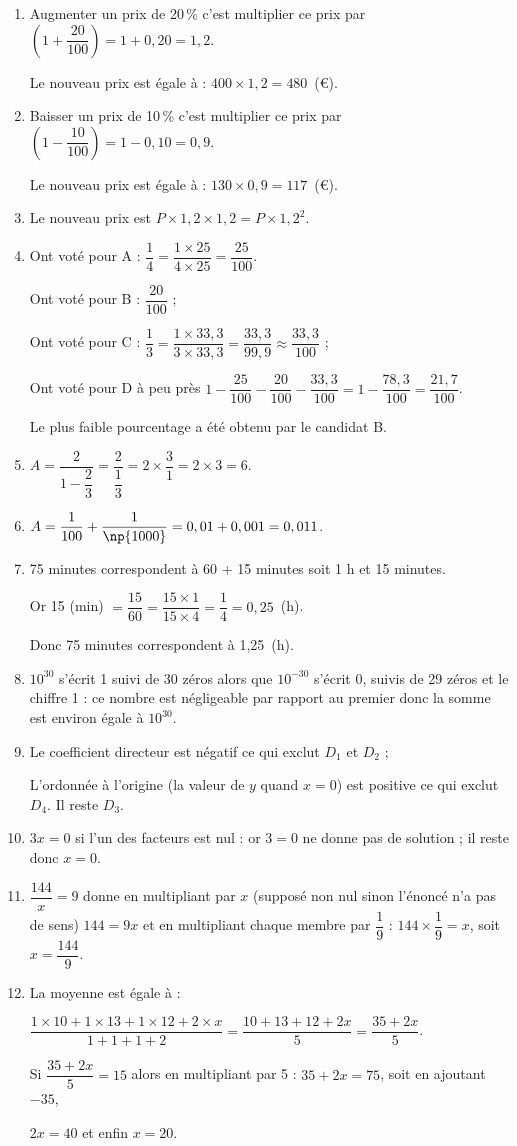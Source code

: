 \begin{enumerate}
\item Augmenter un prix de 20\,\% c'est multiplier ce prix par $\left(1 + \dfrac{20}{100}\right) = 1 + 0,20 = 1,2$.

Le nouveau prix est égale à : $400 \times 1,2 = 480$~(\euro).
\item Baisser un prix de 10\,\% c'est multiplier ce prix par $\left(1 - \dfrac{10}{100}\right) = 1 - 0,10 = 0,9$.

Le nouveau prix est égale à : $130 \times 0,9 = 117$~(\euro).
\item Le nouveau prix est $P \times 1,2 \times 1,2 = P \times 1,2^2$.
\item Ont voté pour A : $\dfrac 14 = \dfrac{1 \times 25}{4 \times 25} = \dfrac{25}{100}$.

Ont voté pour B : $\dfrac{20}{100}$ ;

Ont voté pour C : $\dfrac{1}{3} = \dfrac{1 \times 33,3}{3 \times 33,3} = \dfrac{33,3}{99,9} \approx \dfrac{33,3}{100}$ ;

Ont voté pour D à peu près $1 - \dfrac{25}{100} - \dfrac{20}{100} - \dfrac{33,3}{100} = 1 - \dfrac{78,3}{100} = \dfrac{21,7}{100}$.

Le plus faible pourcentage a été obtenu par le candidat B.
\item $A = \dfrac{2}{1 - \dfrac 23} = \dfrac{2}{\dfrac 13} = 2 \times \dfrac 31 = 2 \times 3 = 6$.
\item $A = \dfrac{1}{100} +  \dfrac{1}{\np{1000}} = 0,01 + 0,001 = 0,011$.
\item 75 minutes correspondent à 60 + 15 minutes soit 1 h et 15 minutes.

Or 15 (min) $= \dfrac{15}{60} = \dfrac{15 \times 1}{15 \times 4} = \dfrac 14 = 0,25$~(h).

Donc 75 minutes correspondent à 1,25~(h).
\item $10^{30}$ s'écrit 1 suivi de 30 zéros alors que  $10^{-30}$ s'écrit 0, suivis de 29 zéros et le chiffre 1 : ce nombre est négligeable par rapport au premier donc la somme est environ égale à  $10^{30}$.
\item Le coefficient directeur est négatif ce qui exclut $D_1$ et $D_2$ ;

L'ordonnée à l'origine (la valeur de $y$ quand $x = 0$) est positive ce qui exclut $D_4$. Il reste $D_3$.
\item $3x = 0$ si l'un des facteurs est nul : or $3 = 0$ ne donne pas de solution ; il reste donc $x = 0$.
\item $\dfrac{144}{x} = 9$ donne en multipliant par $x$ (supposé non nul sinon l'énoncé n'a pas de sens) $144 = 9x$ et en multipliant chaque membre par $\dfrac 19$ : $144 \times \dfrac 19 = x$, soit $x = \dfrac{144}{9}$.
\item La moyenne est égale à :

$\dfrac{1 \times 10 + 1 \times 13 + 1  \times 12 + 2 \times x}{1 + 1 + 1 + 2} = \dfrac{10 + 13 + 12 + 2x}{5} = \dfrac{35 + 2x}{5}$.

Si $\dfrac{35 + 2x}{5} = 15$ alors en multipliant par 5 : $35 + 2x = 75$, soit en ajoutant $- 35$,

 $2x = 40$ et enfin $x = 20$.
\end{enumerate}

